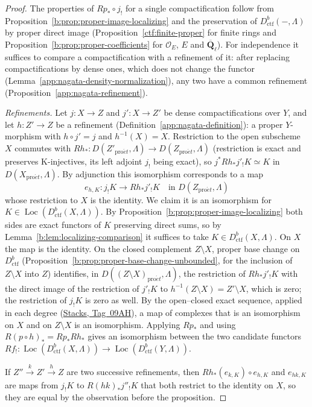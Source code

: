 \documentclass[11pt,a4paper]{article}
\numberwithin{equation}{section}
\theoremstyle{definition}
\theoremstyle{remark}
\newcommand{\Loc}{\operatorname{Loc}}
\newcommand{\Qbar}{\overline{\mathbf Q}_\ell}
\newcommand{\proet}{\mathrm{pro}\acute{e}t}
\newcommand{\stacks}[1]{\href{https://stacks.math.columbia.edu/tag/#1}{\textnormal{Stacks, Tag~#1}}}
\newcommand{\Dctf}{D^b_{\mathrm{ctf}}}
\begin{document}
\begin{proof}
The properties of $Rp_*\circ j_!$ for a single compactification follow from
Proposition~\ref{b:prop:proper-image-localizing} and the preservation
of $\Dctf(-,\Lambda)$ by proper direct image
(Proposition~\ref{ctf:finite-proper} for finite rings and
Proposition~\ref{b:prop:proper-coefficients} for $\mathcal O_E$, $E$ and $\Qbar$). For independence it suffices to
compare a compactification with a refinement of it: after replacing
compactifications by dense ones, which does not change the functor
(Lemma~\ref{app:nagata-density-normalization}), any two have a common
refinement (Proposition~\ref{app:nagata-refinement}).

\emph{Refinements.} Let $j:X\to Z$ and $j':X\to Z'$ be dense
compactifications over $Y$, and let $h:Z'\to Z$ be a refinement
(Definition~\ref{app:nagata-definition}): a proper $Y$-morphism
with $h\circ j'=j$ and $h^{-1}(X)=X$. Restriction to the open subscheme
$X$ commutes with $Rh_*\colon D(Z'_{\proet},\Lambda)\to D(Z_{\proet},\Lambda)$
(restriction is exact and preserves K-injectives,
its left adjoint $j_!$ being exact), so $j^*Rh_*j'_!K\simeq K$ in
$D(X_{\proet},\Lambda)$. By adjunction this isomorphism
corresponds to a map
\begin{equation}
 e_{h,K}:j_!K\longrightarrow Rh_*j'_!K\quad\text{in }D(Z_{\proet},\Lambda)
 \label{b:eq:refinement-map}
\end{equation}
whose restriction to $X$ is the identity. We claim it is an isomorphism
for $K\in\Loc(\Dctf(X,\Lambda))$. By
Proposition~\ref{b:prop:proper-image-localizing} both sides are exact
functors of $K$ preserving direct sums, so by
Lemma~\ref{b:lem:localizing-comparison} it suffices to take
$K\in\Dctf(X,\Lambda)$. On $X$ the map is the identity. On the closed
complement $Z\setminus X$, proper base change on $\Dctf$
(Proposition~\ref{b:prop:proper-base-change-unbounded}, for the inclusion
of $Z\setminus X$ into $Z$) identifies, in
$D((Z\setminus X)_{\proet},\Lambda)$, the restriction
of $Rh_*j'_!K$ with the direct image of the restriction of $j'_!K$ to
$h^{-1}(Z\setminus X)=Z'\setminus X$, which is zero; the restriction of
$j_!K$ is zero as well. By the open--closed exact sequence, applied in
each degree (\stacks{09AH}), a map of complexes that is an
isomorphism on $X$ and on $Z\setminus X$ is an isomorphism. Applying $Rp_*$
and using $R(p\circ h)_*=Rp_*Rh_*$ gives an isomorphism between the two
candidate functors $Rf_!\colon\Loc(\Dctf(X,\Lambda))\to\Loc(\Dctf(Y,\Lambda))$.

If $Z''\xrightarrow{k}Z'\xrightarrow{h}Z$ are two successive refinements,
then $Rh_*(e_{k,K})\circ e_{h,K}$ and $e_{hk,K}$ are maps from $j_!K$ to
$R(hk)_*j''_!K$ that both restrict to the identity on $X$, so they are
equal by the observation before the proposition.


\end{proof}
\end{document}
